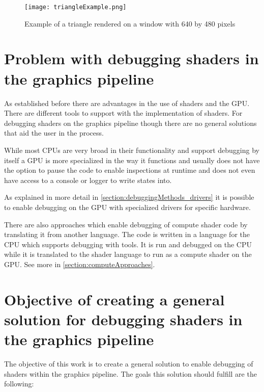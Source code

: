 \begin{figure}[h!]
  \centering 
  \texttt{[image: triangleExample.png]}
  \caption[Screenshot of triangle test render]{Example of a triangle rendered on a window with 640 by 480 pixels}
  \label{fig:triangleSample}
\end{figure}

\section{Problem with debugging shaders in the graphics pipeline}
\label{section:problems}

As established before there are advantages in the use of shaders and the GPU. There are different tools to support with the implementation of shaders. For debugging shaders on the graphics pipeline though there are no general solutions that aid the user in the process.

While most CPUs are very broad in their functionality and support debugging by itself a GPU is more specialized in the way it functions and usually does not have the option to pause the code to enable inspections at runtime and does not even have access to a console or logger to write states into.

As explained in more detail in \autoref{section:debuggingMethods_drivers} it is possible to enable debugging on the GPU with specialized drivers for specific hardware.

There are also approaches which enable debugging of compute shader code by translating it from another language. The code is written in a language for the CPU which supports debugging with tools. It is run and debugged on the CPU while it is translated to the shader language to run as a compute shader on the GPU.
See more in \autoref{section:computeApproaches}.

\section{Objective of creating a general solution for debugging shaders in the graphics pipeline}
\label{paragraph:objective}

The objective of this work is to create a general solution to enable debugging of shaders within the graphics pipeline. The goals this solution should fulfill are the following:


